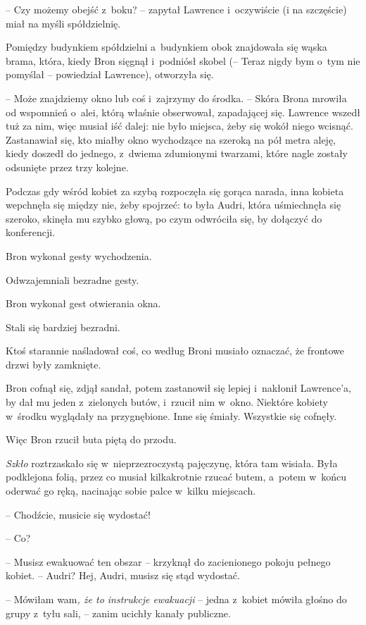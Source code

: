 \documentclass[oneside,polish,11pt,rmheadings]{mwbk}
\begin{document}
-- Czy możemy obejść z~boku? -- zapytał Lawrence i~oczywiście (i na szczęście) miał na myśli spółdzielnię. 

Pomiędzy budynkiem spółdzielni a~budynkiem obok znajdowała się wąska brama, która, kiedy Bron sięgnął i~podniósł skobel (-- Teraz nigdy bym o~tym nie pomyślał -- powiedział Lawrence), otworzyła się. 

-- Może znajdziemy okno lub coś i~zajrzymy do środka.  -- Skóra Brona mrowiła od wspomnień o~alei, którą właśnie obserwował, zapadającej się. Lawrence wszedł tuż za nim, więc musiał iść dalej: nie było miejsca, żeby się wokół niego wcisnąć. Zastanawiał się, kto miałby okno wychodzące na szeroką na pół metra aleję, kiedy doszedł do jednego, z~dwiema zdumionymi twarzami, które nagle zostały odsunięte przez trzy kolejne. 

Podczas gdy wśród kobiet za szybą rozpoczęła się gorąca narada, inna kobieta wepchnęła się między nie, żeby spojrzeć: to była Audri, która uśmiechnęła się szeroko, skinęła mu szybko głową, po czym odwróciła się, by dołączyć do konferencji. 

Bron wykonał gesty wychodzenia. 

Odwzajemniali bezradne gesty. 

Bron wykonał gest otwierania okna. 

Stali się bardziej bezradni. 

Ktoś starannie naśladował coś, co według Broni musiało oznaczać, że frontowe drzwi były zamknięte. 

Bron cofnął się, zdjął sandał, potem zastanowił się lepiej i~nakłonił Lawrence'a, by dał mu jeden z~zielonych butów, i~rzucił nim w~okno. Niektóre kobiety w~środku wyglądały na przygnębione. Inne się śmiały. Wszystkie się cofnęły. 

Więc Bron rzucił buta piętą do przodu. 

\textit{Szkło }roztrzaskało się w~nieprzezroczystą pajęczynę, która tam wisiała. Była podklejona folią, przez co musiał kilkakrotnie rzucać butem, a~potem w~końcu oderwać go ręką, nacinając sobie palce w~kilku miejscach. 

-- Chodźcie, musicie się wydostać!  

-- Co? 

-- Musisz ewakuować ten obszar -- krzyknął do zacienionego pokoju pełnego kobiet. -- Audri? Hej, Audri, musisz się stąd wydostać. 

--  Mówiłam wam\textit{, że to instrukcje ewakuacji} -- jedna z~kobiet mówiła głośno do grupy z~tyłu sali, -- zanim ucichły kanały publiczne.
\end{document}
